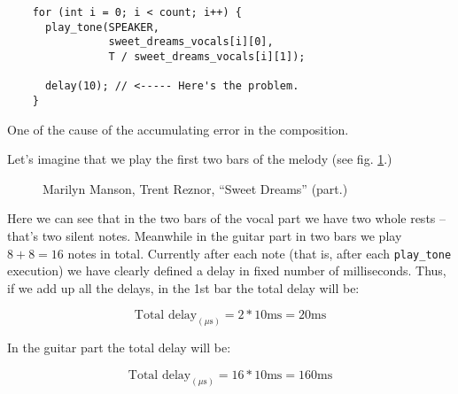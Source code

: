 \documentclass[../sparc.tex]{subfiles}
\begin{document}
\begin{listing}[!h]
  \begin{verbatim}
    for (int i = 0; i < count; i++) {
      play_tone(SPEAKER,
                sweet_dreams_vocals[i][0],
                T / sweet_dreams_vocals[i][1]);

      delay(10); // <----- Here's the problem.
    }
  \end{verbatim}
  \label{listing:music-band-problem-with-delay}
  \caption{One of the cause of the accumulating error in the composition.}
\end{listing}

Let's imagine that we play the first two bars of the melody (see
fig. \ref{fig:lilypond-melody-sweet-dreams-part}.)

\begin{figure}[!h]
  \caption{Marilyn Manson, Trent Reznor, ``Sweet Dreams'' (part.)}
  \label{fig:lilypond-melody-sweet-dreams-part}
\end{figure}

Here we can see that in the two bars of the vocal part we have two whole rests --
that's two silent notes.  Meanwhile in the guitar part in two bars we play $8 +
8 = 16$ notes in total.  Currently after each note (that is, after each
\texttt{play\_tone} execution) we have clearly defined a delay in fixed number
of milliseconds.  Thus, if we add up all the delays, in the 1st bar the total
delay will be:

\begin{equation}
  \mbox{Total delay}_{(\mu\mbox{s})} = 2 * 10 \mbox{ms} = 20 \mbox{ms}
\end{equation}

In the guitar part the total delay will be:

\begin{equation}
  \mbox{Total delay}_{(\mu\mbox{s})} = 16 * 10 \mbox{ms} = 160 \mbox{ms}
\end{equation}
\end{document}
